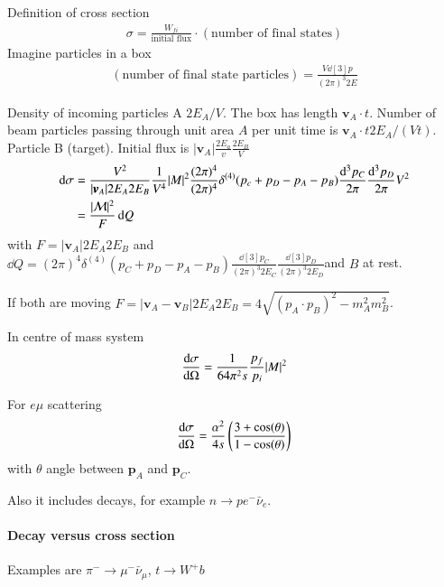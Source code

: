 Definition of cross section
\begin{align}
   \sigma = \frac{W_{fi}}{\text{initial flux}} \cdot (\text{number of final states})
\end{align}
Imagine particles in a box
\begin{align*}
   (\text{number of final state particles}) = \frac{V \dd[3]{p}}{(2\pi)^3 2 E}
\end{align*}

Density of incoming particles A  $2E_A / V$. The box has length $\pmb{v}_A \cdot t$. Number of beam particles passing through unit area $A$ per unit time is $\pmb{v}_A \cdot t 2 E_A/(V t)$.  Particle B (target). Initial flux is $|\pmb{v}_A| \frac{2E_a}{v} \frac{2E_B}{V}$
\begin{align*}
   \dd{\sigma} &= \frac{V^2}{|\pmb{v}_A| 2 E_A 2 E_B} \frac{1}{V^4} |M|^2 \frac{(2\pi)^4}{(2\pi)^4} \delta^{(4)} (p_c + p_D - p_A - p_B) \frac{\dd[3]{p_C}}{2\pi} \frac{\dd[3]{p_D}}{2\pi} V^2 \\
               &= \frac{|\mathcal{M}|^2}{F} \dd{Q}
\end{align*}
with $F = |\pmb{v}_A| 2 E_A 2 E_B$ and $\dd{Q} = (2\pi)^4 \delta^{(4)}(p_C + p_D - p_A - p_B) \frac{\dd[3]{p_C}}{(2\pi)^3 2E_C} \frac{\dd[3]{p_D}}{(2\pi)^3 2 E_D}$and $B$ at rest.

If both are moving $F = |\pmb{v}_A - \pmb{v}_B| 2 E_A 2E_B = 4 \sqrt{(p_A \cdot p_B)^2 - m_A^2 m_B^2 }$.

In centre of mass system
\begin{align}
   \dv{\sigma}{\Omega} = \frac{1}{64 \pi^2 s } \frac{p_f}{p_i} |M|^2 
\end{align}

For $e \mu$ scattering 
\begin{align*}
   \dv{\sigma}{\Omega} = \frac{\alpha^2}{4s} \left( \frac{3 + \cos(\theta)}{1 - \cos(\theta)} \right)
\end{align*}
with $\theta$ angle between $\pmb{p}_A$ and $\pmb{p}_C$.

Also it includes decays, for example $n \rightarrow p e^- \bar{\nu}_e$.

\paragraph{Decay versus cross section}
Examples are $\pi^- \rightarrow \mu^- \bar{\nu}_\mu$, $t \rightarrow W^+ b$

